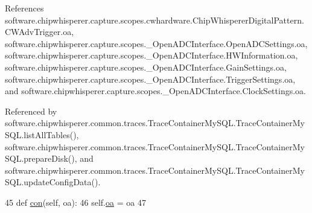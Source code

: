 References software.\+chipwhisperer.\+capture.\+scopes.\+cwhardware.\+Chip\+Whisperer\+Digital\+Pattern.\+C\+W\+Adv\+Trigger.\+oa, software.\+chipwhisperer.\+capture.\+scopes.\+\_\+\+Open\+A\+D\+C\+Interface.\+Open\+A\+D\+C\+Settings.\+oa, software.\+chipwhisperer.\+capture.\+scopes.\+\_\+\+Open\+A\+D\+C\+Interface.\+H\+W\+Information.\+oa, software.\+chipwhisperer.\+capture.\+scopes.\+\_\+\+Open\+A\+D\+C\+Interface.\+Gain\+Settings.\+oa, software.\+chipwhisperer.\+capture.\+scopes.\+\_\+\+Open\+A\+D\+C\+Interface.\+Trigger\+Settings.\+oa, and software.\+chipwhisperer.\+capture.\+scopes.\+\_\+\+Open\+A\+D\+C\+Interface.\+Clock\+Settings.\+oa.



Referenced by software.\+chipwhisperer.\+common.\+traces.\+Trace\+Container\+My\+S\+Q\+L.\+Trace\+Container\+My\+S\+Q\+L.\+list\+All\+Tables(), software.\+chipwhisperer.\+common.\+traces.\+Trace\+Container\+My\+S\+Q\+L.\+Trace\+Container\+My\+S\+Q\+L.\+prepare\+Disk(), and software.\+chipwhisperer.\+common.\+traces.\+Trace\+Container\+My\+S\+Q\+L.\+Trace\+Container\+My\+S\+Q\+L.\+update\+Config\+Data().


\begin{DoxyCode}
45     \textcolor{keyword}{def }\hyperlink{classsoftware_1_1chipwhisperer_1_1capture_1_1scopes_1_1cwhardware_1_1ChipWhispererDigitalPattern_1_1CWAdvTrigger_a3c43129a30bcabc252a3c9e6f73ea0f1}{con}(self, oa):
46         self.\hyperlink{classsoftware_1_1chipwhisperer_1_1capture_1_1scopes_1_1cwhardware_1_1ChipWhispererDigitalPattern_1_1CWAdvTrigger_af26d1fad8d0ca052f1b915eb5de64c37}{oa} = oa
47 
\end{DoxyCode}
\hypertarget{classsoftware_1_1chipwhisperer_1_1capture_1_1scopes_1_1cwhardware_1_1ChipWhispererDigitalPattern_1_1CWAdvTrigger_a2a84070bd8a7e45e0706e9f8021dab09}{}
